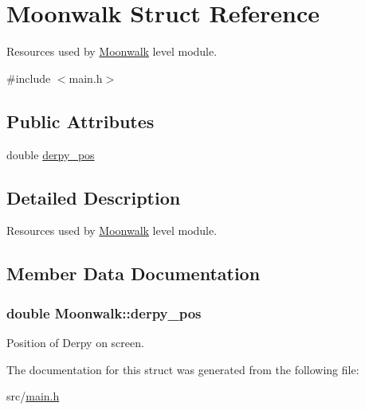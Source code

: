 \hypertarget{structMoonwalk}{\section{Moonwalk Struct Reference}
\label{structMoonwalk}
}


Resources used by \hyperlink{structMoonwalk}{Moonwalk} level module.  




{\ttfamily \#include $<$main.\-h$>$}

\subsection*{Public Attributes}
\begin{DoxyCompactItemize}
\item 
double \hyperlink{structMoonwalk_a69689c77a64928bfb52c1dc1e1f7b33f}{derpy\-\_\-pos}
\end{DoxyCompactItemize}


\subsection{Detailed Description}
Resources used by \hyperlink{structMoonwalk}{Moonwalk} level module. 

\subsection{Member Data Documentation}
\hypertarget{structMoonwalk_a69689c77a64928bfb52c1dc1e1f7b33f}{
\subsubsection[{derpy\-\_\-pos}]{\setlength{\rightskip}{0pt plus 5cm}double Moonwalk\-::derpy\-\_\-pos}}\label{structMoonwalk_a69689c77a64928bfb52c1dc1e1f7b33f}
Position of Derpy on screen. 

The documentation for this struct was generated from the following file\-:\begin{DoxyCompactItemize}
\item 
src/\hyperlink{main_8h}{main.\-h}\end{DoxyCompactItemize}
